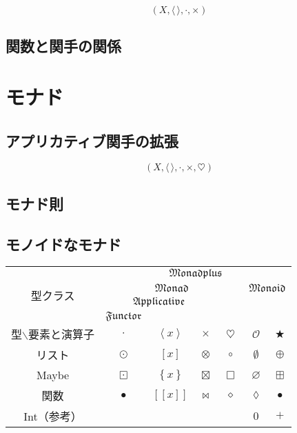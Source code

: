\documentclass[twocolumn]{jsbook}
\def\[{[\![}
\def\]{]\!]}
\newcommand{\typeclassname}[1]{\mathfrak{#1}}
\newcommand{\typeclassapplicative}{\typeclassname{Applicative}}
\newcommand{\typeclassfunctor}{\typeclassname{Functor}}
\newcommand{\typeclassmonad}{\typeclassname{Monad}}
\newcommand{\typeclassmonadplus}{\typeclassname{Monadplus}}
\newcommand{\typeclassmonoid}{\typeclassname{Monoid}}
\newcommand{\anonymousparameter}{\lozenge}
\newcommand{\constantempty}{\emptyset}
\newcommand{\constantnothing}{\varnothing}
\newcommand{\binaryadd}{+}
\newcommand{\binarycompose}{\bullet}
\newcommand{\binaryfunctormap}{\cdot}
\newcommand{\binaryapplicativemap}{\times}
\newcommand{\binarymonadmap}{\heartsuit}%
\newcommand{\binarylistfunctormap}{\odot}
\newcommand{\binarylistapplicativemap}{\otimes}
\newcommand{\binarylistmonadmap}{\circ}%
\newcommand{\binarylistappend}{\oplus}
\newcommand{\binarymaybefunctormap}{\boxdot}
\newcommand{\binarymaybeapplicativemap}{\boxtimes}
\newcommand{\binarymaybemonadmap}{\Box}%
\newcommand{\binarymaybeappend}{\boxplus}
\newcommand{\binaryfunctionfunctormap}{\binarycompose}
\newcommand{\binaryfunctionapplicativemap}{\Join}%
\newcommand{\binaryfunctionmonadmap}{\diamond}%
\newcommand{\applicativetype}[1]{\left\langle#1\right\rangle}
\newcommand{\listtype}[1]{\left[#1\right]}
\newcommand{\maybetype}[1]{\left\{#1\right\}}
\newcommand{\functyontype}[1]{\[#1\]}
\newcommand{\mathbinaryop}{\bigstar}
\newcommand{\mathidentity}{\mathcal{O}}
\begin{document}
$$(X,\langle\,\rangle,\binaryfunctormap,\times)$$


\section{関数と関手の関係}

\chapter{モナド}

\section{アプリカティブ関手の拡張}

$$(X,\langle\,\rangle,\binaryfunctormap,\times,\heartsuit)$$


\section{モナド則}

\section{モノイドなモナド}


\begin{table*}
\begin{center}
\begin{tabular}{||c||c|c|c|c|c|c||}
\hline
\multirow{4}{*}{型クラス}
    &\multicolumn{6}{|c||}{$\typeclassmonadplus$}\\
\cline{2-7}
\multirow{3}{*}{}
    &\multicolumn{4}{|c|}{$\typeclassmonad$}
    &\multicolumn{2}{|c||}{$\typeclassmonoid$}\\
\cline{2-4}
\multirow{2}{*}{}
    &\multicolumn{3}{|c|}{$\typeclassapplicative$}
    &
    &\multicolumn{2}{|c||}{ }\\
\cline{2-2}
{ }
    &\multicolumn{1}{|c|}{$\typeclassfunctor$}
    &\multicolumn{2}{|c|}{ }
    &
    &\multicolumn{2}{|c||}{ }\\
\hline\hline
型$\backslash$要素と演算子
    &$\binaryfunctormap$
    &$\applicativetype{x}$
    &$\binaryapplicativemap$
    &$\binarymonadmap$
    &$\mathidentity$
    &$\mathbinaryop$\\
\hline
リスト
    &$\binarylistfunctormap$
    &$\listtype{x}$
    &$\binarylistapplicativemap$
    &$\binarylistmonadmap$
    &$\constantempty$
    &$\binarylistappend$\\
\hline
Maybe
    &$\binarymaybefunctormap$
    &$\maybetype{x}$
    &$\binarymaybeapplicativemap$
    &$\binarymaybemonadmap$
    &$\constantnothing$
    &$\binarymaybeappend$\\
\hline
関数
    &$\binaryfunctionfunctormap$
    &$\functyontype{x}$
    &$\binaryfunctionapplicativemap$
    &$\binaryfunctionmonadmap$
    &$\anonymousparameter$
    &$\binarycompose$\\
\hline
Int（参考）
    &
    &
    &
    &
    &$0$
    &$\binaryadd$\\
\hline
\end{tabular}
\end{center}
\end{table*}
\end{document}
